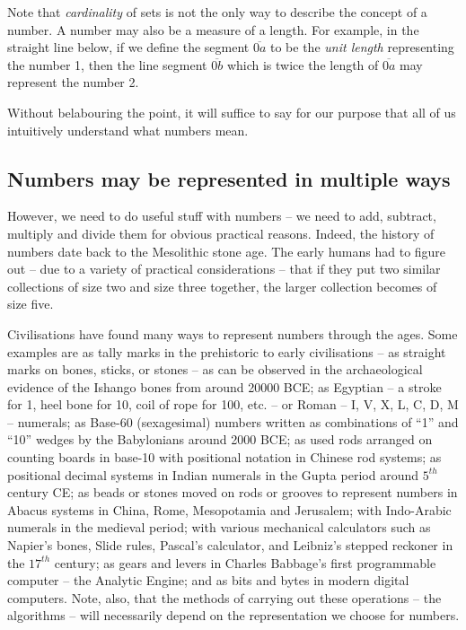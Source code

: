 Note that {\em cardinality} of sets is not the only way to describe the concept of a number. A number may also be a measure of a length. For example, in the straight line below, if we define the segment $\overline{0a}$ to be the {\em unit length} representing the number 1, then the line segment $\overline{0b}$ which is twice the length of $\overline{0a}$ may  represent the number 2.

\vspace{0.5in}
\vspace{0.5in}

Without belabouring the point, it will suffice to say for our purpose that all of us intuitively understand what numbers mean.

\subsection{Numbers may be represented in multiple ways}

However, we need to do useful stuff with numbers -- we need to add, subtract, multiply and divide them for obvious practical reasons.  Indeed, the history of numbers date back to the Mesolithic stone age. The early humans had to figure out -- due to a variety of practical considerations -- that if they put two similar collections of size two and size three together, the larger collection becomes of size five.  

Civilisations have found many ways to represent numbers through the ages. Some examples are as tally marks in the prehistoric to early civilisations  -- as straight marks on bones, sticks, or stones --  as can be observed in the archaeological evidence of the Ishango bones from around 20000 BCE; as Egyptian --  a stroke for 1, heel bone for 10, coil of rope for 100, etc. -- or Roman -- I, V, X, L, C, D, M -- numerals; as Base-60 (sexagesimal) numbers written as combinations of ``1'' and ``10'' wedges by the Babylonians around 2000 BCE; as used rods arranged on counting boards in base-10 with positional notation in Chinese rod systems;  as positional decimal systems in Indian numerals in the Gupta period around $5^{th}$ century CE;  as beads or stones moved on rods or grooves to represent numbers in Abacus systems in China, Rome, Mesopotamia and Jerusalem; with  Indo-Arabic numerals in the medieval period; with various mechanical calculators such as  Napier’s bones,  Slide rules,  Pascal’s calculator, and  Leibniz's stepped reckoner in the $17^{th}$ century; as gears and levers in Charles Babbage's first programmable computer -- the Analytic Engine; and as bits and bytes in modern digital computers. Note, also, that the methods of carrying out these operations -- the algorithms -- will necessarily depend on the representation we choose for numbers. 

